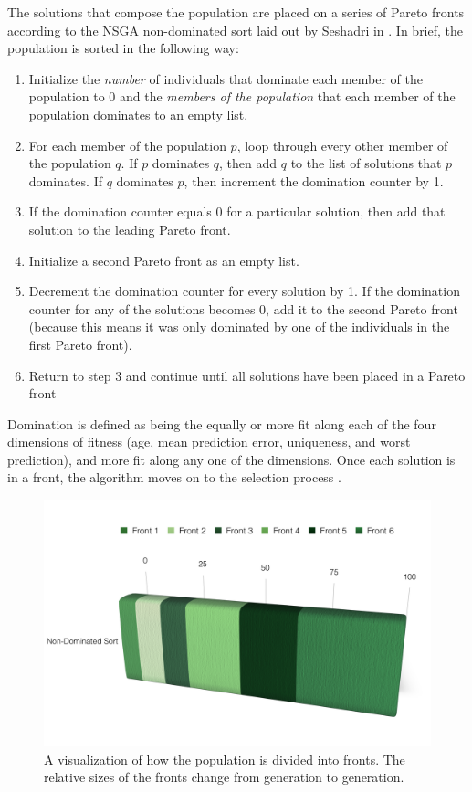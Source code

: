 \documentclass{acm_proc_article-sp}
\begin{document}
The solutions that compose the population are placed on a series of Pareto fronts according to the NSGA non-dominated sort laid out by Seshadri in \cite{pareto}. In brief, the population is sorted in the following way:

\begin{enumerate}
\item Initialize the {\it{number}} of individuals that dominate each member of the population to 0 and the {\it{members of the population}} that each member of the population dominates to an empty list.
\item For each member of the population $p$, loop through every other member of the population $q$. If $p$ dominates $q$, then add $q$ to the list of solutions that $p$ dominates. If $q$ dominates $p$, then increment the domination counter by 1.
\item If the domination counter equals 0 for a particular solution, then add that solution to the leading Pareto front.
\item Initialize a second Pareto front as an empty list.
\item Decrement the domination counter for every solution by 1. If the domination counter for any of the solutions becomes 0, add it to the second Pareto front (because this means it was only dominated by one of the individuals in the first Pareto front).
\item Return to step 3 and continue until all solutions have been placed in a Pareto front
\end{enumerate}

Domination is defined as being the equally or more fit along each of the four dimensions of fitness (age, mean prediction error, uniqueness, and worst prediction), and more fit along any one of the dimensions. Once each solution is in a front, the algorithm moves on to the selection process \cite{horn}.

\begin{figure}[!h]
\center
\includegraphics[scale=0.25]{Fronts.png}
\caption {A visualization of how the population is divided into fronts. The relative sizes of the fronts change from generation to generation.}
\label{fig:bullet}
\end{figure}
\end{document}
